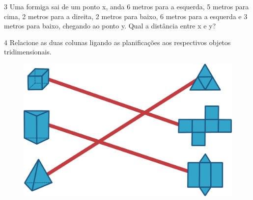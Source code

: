 \begin{emptybox}
\vspace{5cm}
\end{emptybox}

\pagebreak
\num{3} Uma formiga sai de um ponto x, anda 6 metros para a esquerda, 5
metros para cima, 2 metros para a direita, 2 metros para baixo, 6 metros
para a esquerda e 3 metros para baixo, chegando ao ponto y. Qual a
distância entre x e y?

\begin{emptybox}
\end{emptybox}

\pagebreak
\num{4} Relacione as duas colunas ligando as planificações aos respectivos
objetos tridimensionais.

\begin{figure}[htpb!]
\centering
\includegraphics[width=\textwidth]{./ilustras-mat/modulo_10-atividade_4_resposta.png}
\end{figure}

